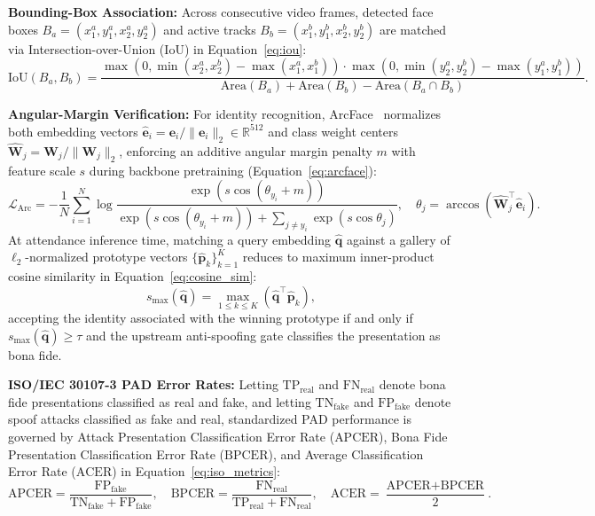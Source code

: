 \noindent\textbf{Bounding-Box Association:} Across consecutive video frames, detected face boxes $B_a = (x_1^a, y_1^a, x_2^a, y_2^a)$ and active tracks $B_b = (x_1^b, y_1^b, x_2^b, y_2^b)$ are matched via Intersection-over-Union ($\text{IoU}$) in Equation~\eqref{eq:iou}:
\begin{equation}
\label{eq:iou}
    \text{IoU}(B_a, B_b) = \frac{\max(0, \min(x_2^a, x_2^b) - \max(x_1^a, x_1^b)) \cdot \max(0, \min(y_2^a, y_2^b) - \max(y_1^a, y_1^b))}{\text{Area}(B_a) + \text{Area}(B_b) - \text{Area}(B_a \cap B_b)}.
\end{equation}

\noindent\textbf{Angular-Margin Verification:} For identity recognition, ArcFace~\cite{deng2019arcface} normalizes both embedding vectors $\hat{\mathbf{e}}_i = \mathbf{e}_i / \|\mathbf{e}_i\|_2 \in \mathbb{R}^{512}$ and class weight centers $\hat{\mathbf{W}}_j = \mathbf{W}_j / \|\mathbf{W}_j\|_2$, enforcing an additive angular margin penalty $m$ with feature scale $s$ during backbone pretraining (Equation~\eqref{eq:arcface}):
\begin{equation}
\label{eq:arcface}
    \mathcal{L}_{\text{Arc}} = -\frac{1}{N} \sum_{i=1}^{N} \log \frac{\exp\!\left(s \cos(\theta_{y_i} + m)\right)}{\exp\!\left(s \cos(\theta_{y_i} + m)\right) + \sum_{j \neq y_i} \exp\!\left(s \cos \theta_j\right)}, \quad \theta_j = \arccos\!\left(\hat{\mathbf{W}}_j^\top \hat{\mathbf{e}}_i\right).
\end{equation}
At attendance inference time, matching a query embedding $\hat{\mathbf{q}}$ against a gallery of $\ell_2$-normalized prototype vectors $\{\hat{\mathbf{p}}_k\}_{k=1}^{K}$ reduces to maximum inner-product cosine similarity in Equation~\eqref{eq:cosine_sim}:
\begin{equation}
\label{eq:cosine_sim}
    s_{\max}(\hat{\mathbf{q}}) = \max_{1 \le k \le K} \left(\hat{\mathbf{q}}^\top \hat{\mathbf{p}}_k\right),
\end{equation}
accepting the identity associated with the winning prototype if and only if $s_{\max}(\hat{\mathbf{q}}) \ge \tau$ and the upstream anti-spoofing gate classifies the presentation as bona fide.

\noindent\textbf{ISO/IEC 30107-3 PAD Error Rates:} Letting $\text{TP}_{\text{real}}$ and $\text{FN}_{\text{real}}$ denote bona fide presentations classified as real and fake, and letting $\text{TN}_{\text{fake}}$ and $\text{FP}_{\text{fake}}$ denote spoof attacks classified as fake and real, standardized PAD performance is governed by Attack Presentation Classification Error Rate ($\text{APCER}$), Bona Fide Presentation Classification Error Rate ($\text{BPCER}$), and Average Classification Error Rate ($\text{ACER}$) in Equation~\eqref{eq:iso_metrics}:
\begin{equation}
\label{eq:iso_metrics}
    \text{APCER} = \frac{\text{FP}_{\text{fake}}}{\text{TN}_{\text{fake}} + \text{FP}_{\text{fake}}}, \quad
    \text{BPCER} = \frac{\text{FN}_{\text{real}}}{\text{TP}_{\text{real}} + \text{FN}_{\text{real}}}, \quad
    \text{ACER} = \frac{\text{APCER} + \text{BPCER}}{2}.
\end{equation}

